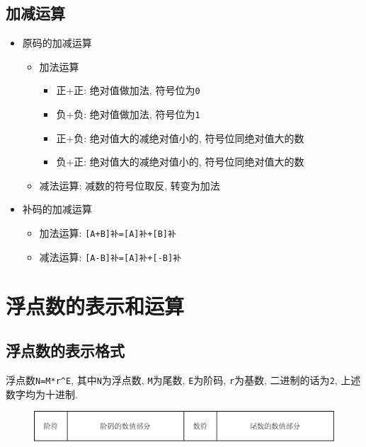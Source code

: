 \subsection{加减运算}
\begin{itemize}
\item 原码的加减运算
\begin{itemize}
\item 加法运算
\begin{itemize}
\item 正+正: 绝对值做加法, 符号位为\verb|0|
\item 负+负: 绝对值做加法, 符号位为\verb|1|
\item 正+负: 绝对值大的减绝对值小的, 符号位同绝对值大的数
\item 负+正: 绝对值大的减绝对值小的, 符号位同绝对值大的数
\end{itemize}
\item 减法运算: 减数的符号位取反, 转变为加法
\end{itemize}
\item 补码的加减运算
\begin{itemize}
\item 加法运算: \verb|[A+B]补=[A]补+[B]补|
\item 减法运算: \verb|[A-B]补=[A]补+[-B]补|
\end{itemize}
\end{itemize}
\section{浮点数的表示和运算}
\subsection{浮点数的表示格式}
浮点数\verb|N=M*r^E|, 其中\verb|N|为浮点数, \verb|M|为尾数, \verb|E|为阶码, \verb|r|为基数, 二进制的话为\verb|2|, 上述数字均为十进制.
\begin{figure}[H]
\centering
\includegraphics[scale=.7]{img/figure9.pdf}
\end{figure}
